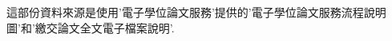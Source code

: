
這部份資料來源是使用'電子學位論文服務'提供的'電子學位論文服務流程說明圖'和'繳交論文全文電子檔案說明'.\\

\ExampleHistoricalNotice




\EndChapter
